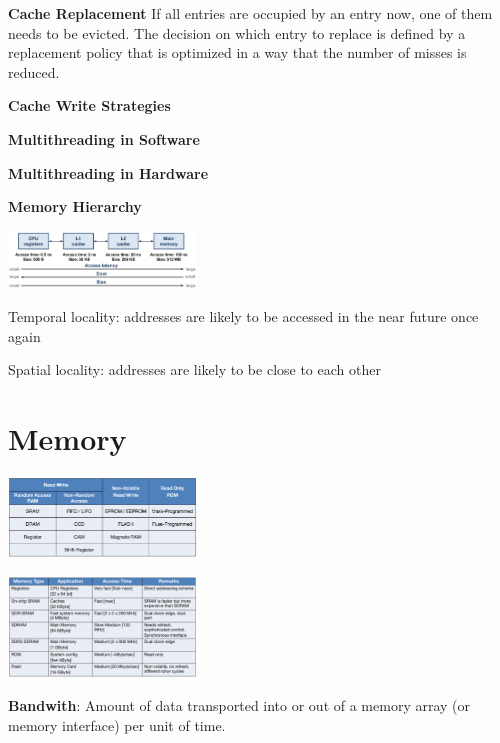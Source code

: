 \documentclass[english]{latex4ei/latex4ei_sheet}
\begin{document}
\textbf{Cache Replacement}
If all entries are occupied by an entry now, one of them needs to be evicted. The decision on which entry to replace is defined by a replacement policy that is optimized in a way that the number of misses is reduced.

\textbf{Cache Write Strategies}

\textbf{Multithreading in Software}

\textbf{Multithreading in Hardware}



\textbf{Memory Hierarchy}

\begin{center}
	\includegraphics[width = 5cm]{images/4.ProcessorArchitecture/MemoryHierarchy.png}
\end{center}

Temporal locality: addresses are likely to be accessed in the near future once again

Spatial locality: addresses are likely to be close to each other

\section{Memory}
\begin{center}
	\includegraphics[width=5cm]{images/5.Memory/MemoryClassificatoin.png}
\end{center}
\begin{center}
	\includegraphics[width=5cm]{images/5.Memory/MemoryCharacteristics.png}
\end{center}

\textbf{Bandwith}: Amount of data transported into or out of a memory array (or
memory interface) per unit of time.
\end{document}
